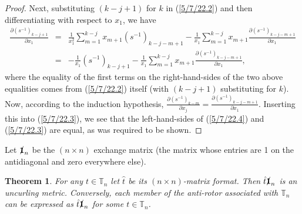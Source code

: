 \documentclass{amsart}
\numberwithin{equation}{section}
\newtheorem{theorem}{Theorem}
\theoremstyle{definition}
\numberwithin{theorem}{section}
\begin{document}
\begin{proof}
Next, substituting $(k-j+1)$ for $k$ in (\ref{5/7/22.2}) and then differentiating with respect to $x_1$, we have   \begin{eqnarray} \nonumber
 \frac{\partial \left( s^{-1} \right)_{k-j+1}}{\partial x_1} &=& \frac{1}{x_1^2} \sum_{m=1}^{k-j} x_{m+1} \left( s^{-1} \right)_{k-j-m+1}    - \frac{1}{x_1} \sum_{m=1}^{k-j} x_{m+1} \frac{\partial \left( s^{-1} \right)_{k-j-m+1}}{\partial x_1}  \\ &=& - \frac{1}{x_1}\left( s^{-1} \right)_{k-j+1}  -  \frac{1}{x_1} \sum_{m=1}^{k-j} x_{m+1} \frac{\partial \left( s^{-1} \right)_{k-j-m+1}}{\partial x_1},\label{5/7/22.3}\end{eqnarray} where the equality of the first terms on the right-hand-sides of the two above equalities comes from (\ref{5/7/22.2}) itself (with $(k-j+1)$ substituting for $k$). 
 Now, according to the induction hypothesis, $\frac{\partial \left( s^{-1} \right)_{k-m}}{\partial x_j} = \frac{\partial \left( s^{-1} \right)_{k-j-m+1}}{\partial x_1}$.  Inserting this into (\ref{5/7/22.3}), we see that the left-hand-sides of (\ref{5/7/22.4}) and (\ref{5/7/22.3}) are equal, as was required to be shown.
 \end{proof} 

Let $\slashed{\bf 1}_n$ be the $(n\times n)$ exchange matrix (the matrix whose entries are 1 on the antidiagonal and zero everywhere else).

\begin{theorem} \label{5/4/22.2} For any $t\in \mathbb{T}_n$ let $\hat{t}$ be its $(n\times n)$-matrix format.    Then $\hat{t} \slashed{\bf 1}_n$ is an uncurling metric.  Conversely, each member of the anti-rotor associated with $\mathbb{T}_n$ can be expressed as $\hat{t}\slashed{\bf 1}_n$ for some $t\in \mathbb{T}_n$.   \end{theorem}
\end{document}
